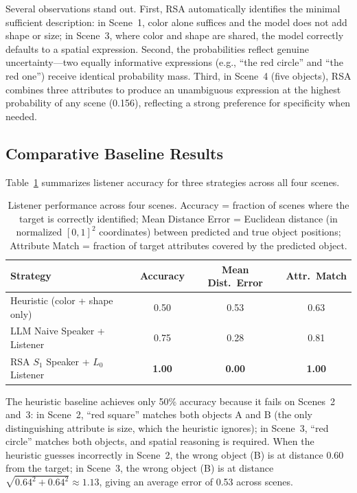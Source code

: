 \documentclass[10pt]{article}
\begin{document}
Several observations stand out. First, RSA automatically identifies the minimal sufficient description: in Scene~1, color alone suffices and the model does not add shape or size; in Scene~3, where color and shape are shared, the model correctly defaults to a spatial expression. Second, the probabilities reflect genuine uncertainty---two equally informative expressions (e.g., ``the red circle'' and ``the red one'') receive identical probability mass. Third, in Scene~4 (five objects), RSA combines three attributes to produce an unambiguous expression at the highest probability of any scene (0.156), reflecting a strong preference for specificity when needed.

\subsection{Comparative Baseline Results}

Table~\ref{tab:results} summarizes listener accuracy for three strategies across all four scenes.

\begin{table}[h]
\centering
\begin{tabular}{lccc}
\toprule
Strategy & Accuracy & Mean Dist.\ Error & Attr.\ Match \\
\midrule
Heuristic (color + shape only) & 0.50 & 0.53 & 0.63 \\
LLM Naive Speaker + Listener   & 0.75 & 0.28 & 0.81 \\
RSA $S_1$ Speaker + $L_0$ Listener & \textbf{1.00} & \textbf{0.00} & \textbf{1.00} \\
\bottomrule
\end{tabular}
\caption{Listener performance across four scenes. Accuracy = fraction of scenes where the target is correctly identified; Mean Distance Error = Euclidean distance (in normalized $[0,1]^2$ coordinates) between predicted and true object positions; Attribute Match = fraction of target attributes covered by the predicted object.}
\label{tab:results}
\end{table}

The heuristic baseline achieves only 50\% accuracy because it fails on Scenes~2 and~3: in Scene~2, ``red square'' matches both objects A and B (the only distinguishing attribute is size, which the heuristic ignores); in Scene~3, ``red circle'' matches both objects, and spatial reasoning is required. When the heuristic guesses incorrectly in Scene~2, the wrong object (B) is at distance 0.60 from the target; in Scene~3, the wrong object (B) is at distance $\sqrt{0.64^2 + 0.64^2} \approx 1.13$, giving an average error of 0.53 across scenes.
\end{document}
